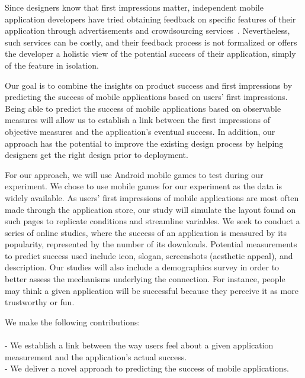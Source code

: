 Since designers know that first impressions matter, independent mobile application developers have tried obtaining feedback on specific features of their application through advertisements and crowdsourcing services~\cite{needsource}. Nevertheless, such services can be costly, and their feedback process is not formalized or offers the developer a holistic view of the potential success of their application, simply of the feature in isolation.

Our goal is to combine the insights on product success and first impressions by predicting the success of mobile applications based on users' first impressions. Being able to predict the success of mobile applications  based on observable measures will allow us to establish a link between the first impressions of objective measures and the application’s eventual success. In addition, our approach has the potential to improve the existing design process by helping designers get the right design prior to deployment.

For our approach, we will use Android mobile games to test during our experiment. We chose to use mobile games for our experiment as the data is widely available. As users' first impressions of mobile applications are most often made through the application store, our study will simulate the layout found on such pages to replicate conditions and streamline variables. We seek to conduct a series of online studies, where the success of an application is measured by its popularity, represented by the number of its downloads. Potential measurements to predict success used include icon, slogan, screenshots (aesthetic appeal), and description. Our studies will also include a demographics survey in order to better assess the mechanisms underlying the connection. For instance, people may think a given application will be successful because they perceive it as more trustworthy or fun.

We make the following contributions: \\ \\
- We establish a link between the way users feel about a given application measurement and the application's actual success.\\
- We deliver a novel approach to predicting the success of mobile applications.
